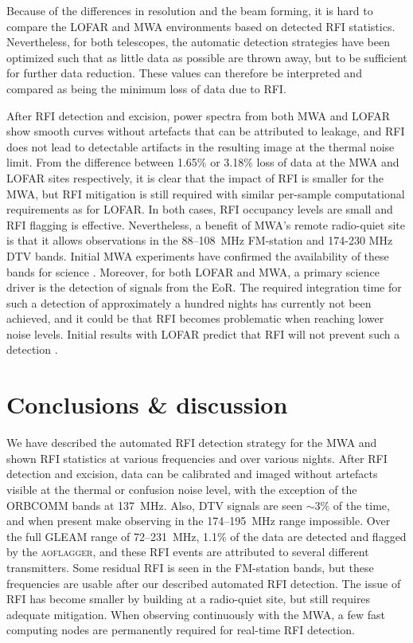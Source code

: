 \documentclass{pasa}
\begin{document}
Because of the differences in resolution and the beam forming, it is hard to compare the LOFAR and MWA environments based on detected RFI statistics. Nevertheless, for both telescopes, the automatic detection strategies have been optimized such that as little data as possible are thrown away, but to be sufficient for further data reduction. These values can therefore be interpreted and compared as being the minimum loss of data due to RFI.

After RFI detection and excision, power spectra from both MWA and LOFAR show smooth curves without artefacts that can be attributed to leakage, and RFI does not lead to detectable artifacts in the resulting image at the thermal noise limit. From the difference between 1.65\% or 3.18\% loss of data at the MWA and LOFAR sites respectively, it is clear that the impact of RFI is smaller for the MWA, but RFI mitigation is still required with similar per-sample computational requirements as for LOFAR. In both cases, RFI occupancy levels are small and RFI flagging is effective. Nevertheless, a benefit of MWA's remote radio-quiet site is that it allows observations in the 88--108~MHz FM-station and 174-230 MHz DTV bands. Initial MWA experiments have confirmed the availability of these bands for science \citep{mckinley-moon-2013,hurley-walker-mwacs-2014}. Moreover, for both LOFAR and MWA, a primary science driver is the detection of signals from the EoR. The required integration time for such a detection of approximately a hundred nights has currently not been achieved, and it could be that RFI becomes problematic when reaching lower noise levels. Initial results with LOFAR predict that RFI will not prevent such a detection \citep{ncp-eor-yatawatta, offringa-rfi-distributions}.

\section{Conclusions \& discussion} \label{ch:conclusions-and-discussion}
We have described the automated RFI detection strategy for the MWA and shown RFI statistics at various frequencies and over various nights. After RFI detection and excision, data can be calibrated and imaged without artefacts visible at the thermal or confusion noise level, with the exception of the ORBCOMM bands at 137~MHz. Also, DTV signals are seen $\sim3\%$ of the time, and when present make observing in the 174--195~MHz range impossible. Over the full GLEAM range of 72--231~MHz, 1.1\% of the data are detected and flagged by the \textsc{aoflagger}, and these RFI events are attributed to several different transmitters. Some residual RFI is seen in the FM-station bands, but these frequencies are usable after our described automated RFI detection. The issue of RFI has become smaller by building at a radio-quiet site, but still requires adequate mitigation. When observing continuously with the MWA, a few fast computing nodes are permanently required for real-time RFI detection.
\end{document}
